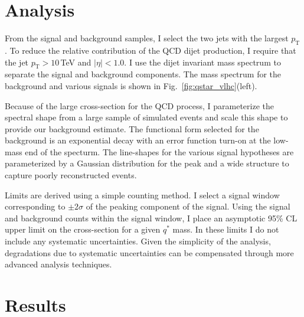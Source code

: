 \section{Analysis}

From the signal and background samples, I select the two jets with the largest
$p_\mathrm{T}$.  To reduce the relative contribution of the QCD dijet
production, I require that the jet $p_\mathrm{T} > 10$\,TeV and $|\eta
| < 1.0$.  I use the dijet invariant mass spectrum to separate the
signal and background components.  The mass spectrum for the
background and various signals is shown in
Fig.~\ref{fig:qstar_vlhc}(left).  

Because of the large cross-section for the QCD process, I parameterize
the spectral shape from a large sample of simulated events and scale
this shape to provide our background estimate.  The functional form
selected for the background is an exponential decay with an error
function turn-on at the low-mass end of the specturm.  The line-shapes
for the various signal hypotheses are parameterized by a Gaussian
distribution for the peak and a wide structure to capture poorly
reconstructed events.

Limits are derived using a simple counting method.  I select a signal
window corresponding to $\pm 2\sigma$ of the peaking component of the
signal.  Using the signal and background counts within the signal
window, I place an asymptotic 95\% CL upper limit on the
cross-section for a given $q^*$ mass.  In these limits I do not
include any systematic uncertainties.  Given the simplicity of the
analysis, degradations due to systematic uncertainties can be
compensated through more advanced analysis techniques.

\section{Results}


